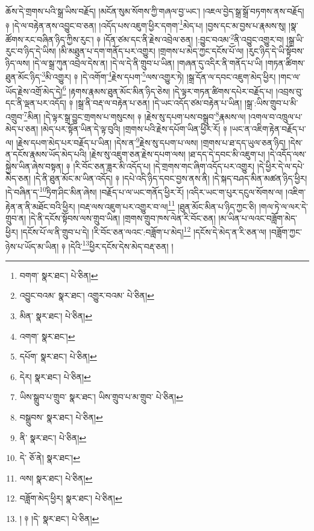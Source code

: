 ཆོས་དེ་གྲགས་པའི་སྒྲ་ཡིས་བརྗོད། །མངོན་སུམ་སོགས་ཀྱི་གཞལ་བྱ་ཡང་། །འཇལ་བྱེད་སྒྲ་སྒྲོ་བཏགས་ནས་བརྗོད། ༈ །དེ་ལ་བརྟེན་ནས་འབྱུང་བ་ཅན། །འདོད་པས་འཇུག་ཕྱིར་དགག་\footnote{བགག་  སྣར་ཐང་།  པེ་ཅིན། }མེད་པ། །བྱས་དང་མ་བྱས་པ་རྣམས་སུ། །སྣ་ཚོགས་རང་བཞིན་ཉིད་ཀྱིས་རུང་། ༈ །དོན་ཙམ་དང་ནི་རྗེས་འབྲེལ་ཅན། །:བྱུང་བའམ་\footnote{འབྱུང་བའམ་  སྣར་ཐང་། འགྱུར་བའམ་  པེ་ཅིན། }ནི་འབྱུང་འགྱུར་བ། །སྒྲ་ཡི་རུང་བ་ཉིད་དེ་ཡིས། །མི་མཐུན་པ་དག་གནོད་པར་འགྱུར། །གྲགས་པ་མེད་ཀྱང་དངོས་པོ་ལ། །རུང་ཉིད་དེ་ཡི་སྟོབས་ཉིད་ལས། །དེ་ལ་སྒྲ་ཀུན་འབྲེལ་དེས་ན། །དེ་ལ་དེ་ནི་གྲུབ་པ་ཡིན། །གཞན་དུ་འདིར་ནི་གནོད་པ་ཡི། །གཏན་ཚིགས་ཐུན་མོང་ཉིད་\footnote{མིན་  སྣར་ཐང་།  པེ་ཅིན། }མི་འགྱུར། ༈ །དེ་འགོག་\footnote{འགག་  སྣར་ཐང་། }རྗེས་དཔག་\footnote{དཔོག་  སྣར་ཐང་།  པེ་ཅིན། }ལས་འགྱུར་ཏེ། །སྒྲ་དོན་ལ་དབང་འཇུག་མེད་ཕྱིར། །གང་ལ་ཡོད་རྗེས་འགྲོ་མེད་དེ།\footnote{དེར།  སྣར་ཐང་།  པེ་ཅིན། } །རྟགས་རྣམས་ཐུན་མོང་མིན་ཉིད་ཅེས། །དེ་ལྟར་གཏན་ཚིགས་དཔེར་བརྗོད་པ། །འབྲས་བུ་དང་ནི་ལྡན་པར་འདོད། ༈ །སྒྲ་ནི་བརྡ་ལ་བརྟེན་པ་ཅན། །དེ་ཡང་འདོད་ཙམ་བརྟེན་པ་ཡིན། །སྒྲ་:ཡིས་གྲུབ་པ་མི་འགྲུབ་\footnote{ཡིས་སྒྲུབ་པ་གྲུབ་  སྣར་ཐང་། ཡིས་གྲུབ་པ་མ་གྲུབ་  པེ་ཅིན། }མིན། །དེ་ལྟར་སྒྲ་བྱུང་གྲགས་པ་གསུངས། ༈ །རྗེས་སུ་དཔག་པས་བསྒྲུབ་\footnote{བསྒྲུབས་  སྣར་ཐང་།  པེ་ཅིན། }རྣམས་ལ། །འགལ་བ་འཁྲུལ་པ་མེད་པ་ཅན། །མེད་པར་སྟོན་ཡིན་དེ་ལྟ་བུའི། །གྲགས་པའི་རྗེས་དཔོག་ཡིན་ཕྱིར་རོ། ༈ །ཡང་ན་འཇིག་རྟེན་བརྗོད་པ་ལ། །རྗེས་དཔག་མེད་པར་བརྗོད་པ་ཡིན། །དེས་ན་\footnote{ནི་  སྣར་ཐང་།  པེ་ཅིན། }རྗེས་སུ་དཔག་པ་ལས། །གྲགས་པ་ཐ་དད་ཡུལ་ཅན་ཉིད། །དེས་ན་དངོས་རྣམས་ཡོད་མེད་པའི། །རྗེས་སུ་འཇུག་ཅན་རྗེས་དཔག་ལས། །ཐ་དད་དེ་དབང་མི་འཇུག་པ། །དེ་འདོད་ལས་སྐྱེས་ཡིན་ཞེས་བསྟན། ༈ །རི་བོང་ཅན་ཟླར་མི་འདོད་པ། །དེ་གྲགས་གང་ཞིག་འདོད་པར་འགྱུར། །དེ་ཕྱིར་དེ་ལ་དཔེ་མེད་ཅན། །དེ་ནི་ཐུན་མོང་མ་ཡིན་འདོད། ༈ །དཔེ་འདི་ཉིད་དབང་བྱས་ནས་ནི། །དེ་སྐད་བཤད་མིན་མཚན་ཉིད་ཕྱིར། །དེ་བཞིན་ད་\footnote{དེ་  ཅོ་ནེ།  སྣར་ཐང་། }ཏྲིག་ཤིང་མིན་ཞེས། །བརྗོད་པ་ལ་ཡང་གནོད་ཕྱིར་རོ། །འདིར་ཡང་ག་པུར་དངུལ་སོགས་ལ། །འཇིག་རྟེན་ན་ནི་མཐོང་བའི་ཕྱིར། །བརྡ་ལས་འཇུག་པར་འགྱུར་བ་ལ།\footnote{ལས།  སྣར་ཐང་།  པེ་ཅིན། } །ཐུན་མོང་མིན་པ་ཉིད་ཀྱང་ཅི། །གལ་ཏེ་ལ་ལར་དེ་གྲུབ་ན། །དེ་ནི་དངོས་སྟོབས་ལས་གྲུབ་ཡིན། །གྲགས་གྲུབ་ཁས་ལེན་རི་བོང་ཅན། །མ་ཡིན་པ་ལའང་བཟློག་མེད་ཕྱིར། །དངོས་པོ་ལ་ནི་གྲུབ་པ་དེ། །རི་བོང་ཅན་ལའང་:བཟློག་པ་མེད།\footnote{བཟློག་མེད་ཕྱིར།  སྣར་ཐང་།  པེ་ཅིན། } །དངོས་དེ་མེད་ན་རི་ཅན་ལ། །བཟློག་ཀྱང་ཉེས་པ་ཡོད་མ་ཡིན། ༈ །དེའི་\footnote{། ༈ །དེ་  སྣར་ཐང་།  པེ་ཅིན། }ཕྱིར་དངོས་དེས་མེད་བརྡ་ཅན། །
